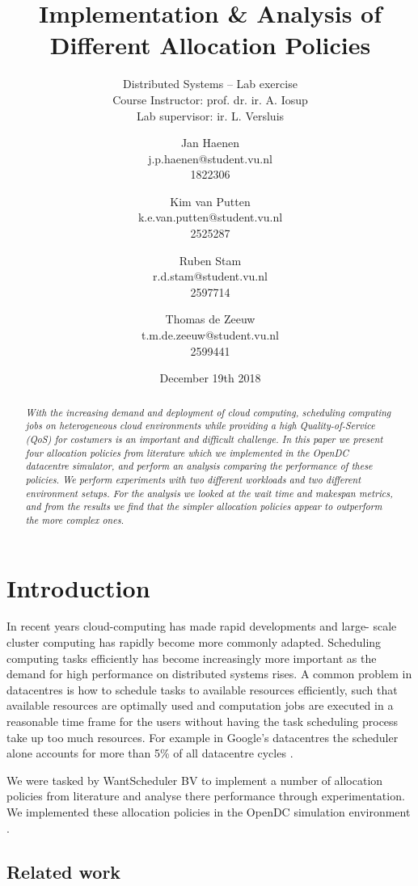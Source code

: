 \documentclass[twocolumn,a4]{scrartcl}
\title{Implementation \& Analysis of Different Allocation Policies}
\subtitle{
  Distributed Systems -- Lab exercise \\
  Course Instructor: prof. dr. ir. A. Iosup \\
  Lab supervisor: ir. L. Versluis
}
\author{
  Jan Haenen \\ j.p.haenen@student.vu.nl \\1822306 \and
  Kim van Putten \\ k.e.van.putten@student.vu.nl \\ 2525287 \and
  Ruben Stam \\ r.d.stam@student.vu.nl \\ 2597714 \and
  Thomas de Zeeuw \\ t.m.de.zeeuw@student.vu.nl \\ 2599441
}
\date{December 19th 2018}
\begin{document}
\maketitle

\begin{abstract}

\emph{With the increasing demand and deployment of cloud computing, scheduling computing jobs on heterogeneous cloud environments while providing a high Quality-of-Service (QoS) for costumers is an important and difficult challenge. In this paper we present four allocation policies from literature which we implemented in the OpenDC datacentre simulator, and perform an analysis comparing the performance of these policies. We perform experiments with two different workloads and two different environment setups. For the analysis we looked at the wait time and makespan metrics, and from the results we find that the simpler allocation policies appear to outperform the more complex ones.}

\end{abstract}



\section{Introduction} \label{sec_introduction}

In recent years cloud-computing has made rapid developments and large- scale cluster computing has rapidly become more commonly adapted. Scheduling computing tasks efficiently has become increasingly more important as the demand for high performance on distributed systems rises. A common problem in datacentres is how to schedule tasks to available resources efficiently, such that available resources are optimally used and computation jobs are executed in a reasonable time frame for the users without having the task scheduling process take up too much resources. For example in Google's datacentres the scheduler alone accounts for more than 5\% of all datacentre cycles \cite{DBLP:conf/isca/KanevDHRMWB15}.

We were tasked by WantScheduler BV to implement a number of allocation policies from literature and analyse there performance through experimentation. We implemented these allocation policies in the OpenDC simulation environment \cite{DBLP:conf/ispdc/IosupABBENOTVV17}.

\subsection{Related work} \label{sec_related_work}
\end{document}
